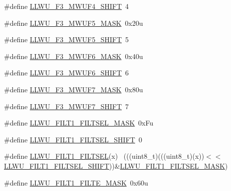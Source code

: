 \begin{DoxyCompactItemize}
\#define \hyperlink{group___l_l_w_u___register___masks_gac1d2eb89a620cf503f11eecf9e8ece1f}{L\+L\+W\+U\+\_\+\+F3\+\_\+\+M\+W\+U\+F4\+\_\+\+S\+H\+I\+FT}~4
\item 
\#define \hyperlink{group___l_l_w_u___register___masks_gaeb14754fa2d5b4c1fd50b9df98f11b01}{L\+L\+W\+U\+\_\+\+F3\+\_\+\+M\+W\+U\+F5\+\_\+\+M\+A\+SK}~0x20u
\item 
\#define \hyperlink{group___l_l_w_u___register___masks_gac8a9d2de72a5034fae66714d25aa5f33}{L\+L\+W\+U\+\_\+\+F3\+\_\+\+M\+W\+U\+F5\+\_\+\+S\+H\+I\+FT}~5
\item 
\#define \hyperlink{group___l_l_w_u___register___masks_gabd1f915448c7918a8aabc74239d7e773}{L\+L\+W\+U\+\_\+\+F3\+\_\+\+M\+W\+U\+F6\+\_\+\+M\+A\+SK}~0x40u
\item 
\#define \hyperlink{group___l_l_w_u___register___masks_gaab649d98d5d8eb9f2f272649ace225c4}{L\+L\+W\+U\+\_\+\+F3\+\_\+\+M\+W\+U\+F6\+\_\+\+S\+H\+I\+FT}~6
\item 
\#define \hyperlink{group___l_l_w_u___register___masks_ga2ddb11dc5e9f8a8404ccf99f10046b5a}{L\+L\+W\+U\+\_\+\+F3\+\_\+\+M\+W\+U\+F7\+\_\+\+M\+A\+SK}~0x80u
\item 
\#define \hyperlink{group___l_l_w_u___register___masks_gaee31def5b074844cbf46f9d7e54d2d4f}{L\+L\+W\+U\+\_\+\+F3\+\_\+\+M\+W\+U\+F7\+\_\+\+S\+H\+I\+FT}~7
\item 
\#define \hyperlink{group___l_l_w_u___register___masks_gaa44e21d07f509d1f5d6cec9da32ab8ab}{L\+L\+W\+U\+\_\+\+F\+I\+L\+T1\+\_\+\+F\+I\+L\+T\+S\+E\+L\+\_\+\+M\+A\+SK}~0x\+Fu
\item 
\#define \hyperlink{group___l_l_w_u___register___masks_gaab2a7991b2b135f0557b1b41cc3528f7}{L\+L\+W\+U\+\_\+\+F\+I\+L\+T1\+\_\+\+F\+I\+L\+T\+S\+E\+L\+\_\+\+S\+H\+I\+FT}~0
\item 
\#define \hyperlink{group___l_l_w_u___register___masks_ga40cff44853a583ea7ff5a043a335944b}{L\+L\+W\+U\+\_\+\+F\+I\+L\+T1\+\_\+\+F\+I\+L\+T\+S\+EL}(x)                                    ~(((uint8\+\_\+t)(((uint8\+\_\+t)(x))$<$$<$\hyperlink{group___l_l_w_u___register___masks_gaab2a7991b2b135f0557b1b41cc3528f7}{L\+L\+W\+U\+\_\+\+F\+I\+L\+T1\+\_\+\+F\+I\+L\+T\+S\+E\+L\+\_\+\+S\+H\+I\+FT}))\&\hyperlink{group___l_l_w_u___register___masks_gaa44e21d07f509d1f5d6cec9da32ab8ab}{L\+L\+W\+U\+\_\+\+F\+I\+L\+T1\+\_\+\+F\+I\+L\+T\+S\+E\+L\+\_\+\+M\+A\+SK})
\item 
\#define \hyperlink{group___l_l_w_u___register___masks_gae449f984f9cfeec99ab8380e356b57c7}{L\+L\+W\+U\+\_\+\+F\+I\+L\+T1\+\_\+\+F\+I\+L\+T\+E\+\_\+\+M\+A\+SK}~0x60u
\item 
$$
\end{DoxyCompactItemize}
